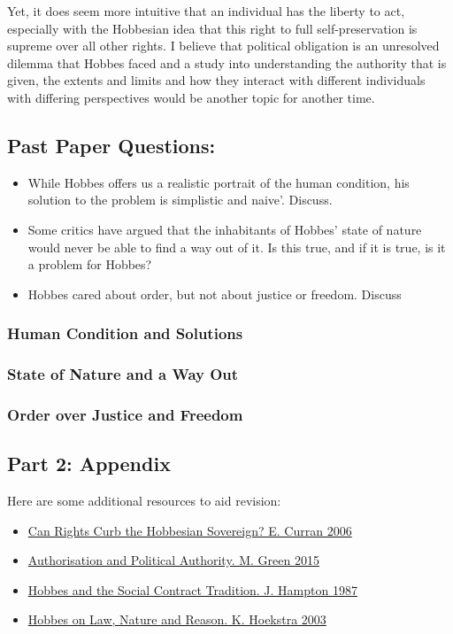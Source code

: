 \documentclass[12pt, letterpaper]{article}
\begin{document}
Yet, it does seem more intuitive that an individual has the liberty to act, especially with the Hobbesian idea that this right to full self-preservation is supreme over all other rights. I believe that political obligation is an unresolved dilemma that Hobbes faced and a study into understanding the authority that is given, the extents and limits and how they interact with different individuals with differing perspectives would be another topic for another time.


\subsection{Past Paper Questions:}
\begin{itemize}
	\item While Hobbes offers us a realistic portrait of the human condition, his solution to the problem is simplistic and naive'. Discuss.
	\item Some critics have argued that the inhabitants of Hobbes' state of nature would never be able to find a way out of it. Is this true, and if it is true, is it a problem for Hobbes?
	\item Hobbes cared about order, but not about justice or freedom. Discuss
\end{itemize}

\subsubsection{Human Condition and Solutions}

\subsubsection{State of Nature and a Way Out}

\subsubsection{Order over Justice and Freedom}

\subsection{Part 2: Appendix}
Here are some additional resources to aid revision:
\begin{itemize}
	\item \href{https://www.jstor.org/stable/27639430?seq=1#page_scan_tab_contents}{Can Rights Curb the Hobbesian Sovereign? E. Curran 2006}
	\item \href{http://muse.jhu.edu.gate3.library.lse.ac.uk/article/566925}{Authorisation and Political Authority. M. Green 2015}
	\item \href{https://www-cambridge-org.gate3.library.lse.ac.uk/core/books/hobbes-and-the-social-contract-tradition/269668B2323D23C3799CCC84A6A64D66}{Hobbes and the Social Contract Tradition. J. Hampton 1987}
	\item \href{http://muse.jhu.edu.gate3.library.lse.ac.uk/article/37609}{Hobbes on Law, Nature and Reason. K. Hoekstra 2003}

\end{itemize}
\end{document}
